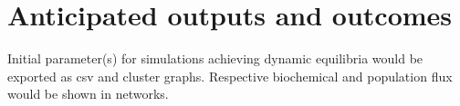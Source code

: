 \documentclass[a4paper, 11pt]{article}
\begin{document}
\section{Anticipated outputs and outcomes}
Initial parameter(s) for simulations achieving dynamic equilibria would be exported as csv and cluster graphs.  Respective biochemical and population flux would be shown in networks.
\end{document}
